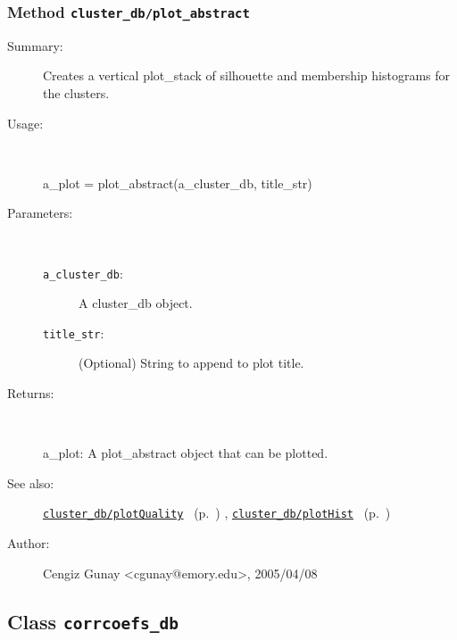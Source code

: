 \subsubsection[Method \texttt{plot\_abstract}]{Method \texttt{cluster\_db/plot\_abstract}}%
%
\label{ref_cluster_db__plot_abstract}%
\hypertarget{ref_cluster_db__plot_abstract}{}%
\begin{description}
\item[Summary:]Creates a vertical plot\_stack of silhouette and membership histograms for the clusters.
%
\item[Usage:]~%
\begin{lyxcode}%
a\_plot = plot\_abstract(a\_cluster\_db, title\_str)
%
\end{lyxcode}%
%
%
\item[Parameters:]~
\begin{description}%
\item[\texttt{a\_cluster\_db}:]
 A cluster\_db object.
\item[\texttt{title\_str}:]
 (Optional) String to append to plot title.
\end{description}%
%
\item[Returns:
]~

	a\_plot: A plot\_abstract object that can be plotted.
%
%
\item[See also:]%
\hyperlink{ref_cluster_db__plotQuality}{\texttt{cluster\_db/plotQuality}}%
\ (p.~\pageref{ref_cluster_db__plotQuality})%
%
, \hyperlink{ref_cluster_db__plotHist}{\texttt{cluster\_db/plotHist}}%
\ (p.~\pageref{ref_cluster_db__plotHist})%
%
%
\item[Author:]%
Cengiz Gunay <cgunay@emory.edu>, 2005/04/08
%
\end{description}
\methodline%
\subsection{Class \texttt{corrcoefs\_db}}%
%
\label{ref_corrcoefs_db}%
\hypertarget{ref_corrcoefs_db}{}%

